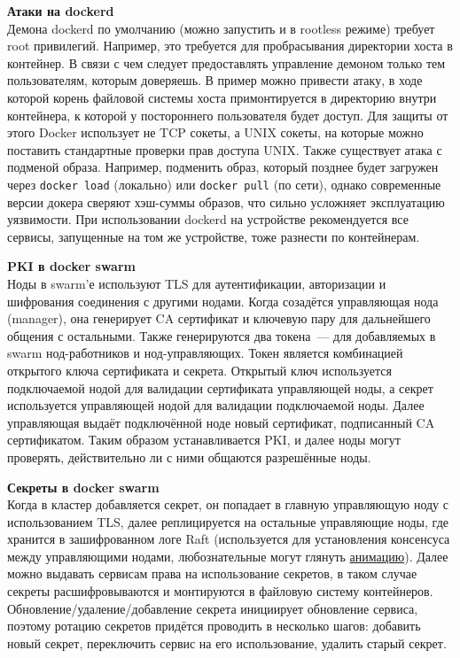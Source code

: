     \textbf{Атаки на dockerd} ~\\
    Демона dockerd по умолчанию (можно запустить и в rootless режиме) требует root привилегий. Например, это требуется для пробрасывания директории хоста в контейнер. В связи с чем следует предоставлять управление демоном только тем пользователям, которым доверяешь. В пример можно привести атаку, в ходе которой корень файловой системы хоста примонтируется в директорию внутри контейнера, к которой у постороннего пользователя будет доступ. Для защиты от этого Docker использует не TCP сокеты, а UNIX сокеты, на которые можно поставить стандартные проверки прав доступа UNIX.
    Также существует атака с подменой образа. Например, подменить образ, который позднее будет загружен через \texttt{docker load} (локально) или \texttt{docker pull} (по сети), однако современные версии докера сверяют хэш-суммы образов, что сильно усложняет эксплуатацию уязвимости.\autocite{DockerSecurity}
    При использовании dockerd на устройстве рекомендуется все сервисы, запущенные на том же устройстве, тоже разнести по контейнерам.

    \textbf{PKI в docker swarm} ~\\
    Ноды в swarm'е используют TLS для аутентификации, авторизации и шифрования соединения с другими нодами. Когда созадётся управляющая нода (manager), она генерирует CA сертификат и ключевую пару для дальнейшего общения с остальными. Также генерируются два токена~--- для добавляемых в swarm нод-работников и нод-управляющих. Токен является комбинацией открытого ключа сертификата и секрета. Открытый ключ используется подключаемой нодой для валидации сертификата управляющей ноды, а секрет используется управляющей нодой для валидации подключаемой ноды. Далее управляющая выдаёт подключённой ноде новый сертификат, подписанный CA сертификатом. Таким образом устанавливается PKI, и далее ноды могут проверять, действительно ли с ними общаются разрешённые ноды.\autocite{DockerSwarmPKI}

    \textbf{Секреты в docker swarm} ~\\
    Когда в кластер добавляется секрет, он попадает в главную управляющую ноду с использованием TLS, далее реплицируется на остальные управляющие ноды, где хранится в зашифрованном логе Raft (используется для установления консенсуса между управляющими нодами, любознательные могут глянуть \href{http://thesecretlivesofdata.com/raft/}{анимацию}). Далее можно выдавать сервисам права на использование секретов, в таком случае секреты расшифровываются и монтируются в файловую систему контейнеров. Обновление/удаление/добавление секрета инициирует обновление сервиса, поэтому ротацию секретов придётся проводить в несколько шагов: добавить новый секрет, переключить сервис на его использование, удалить старый секрет.\autocite{DockerSwarmSecrets}

